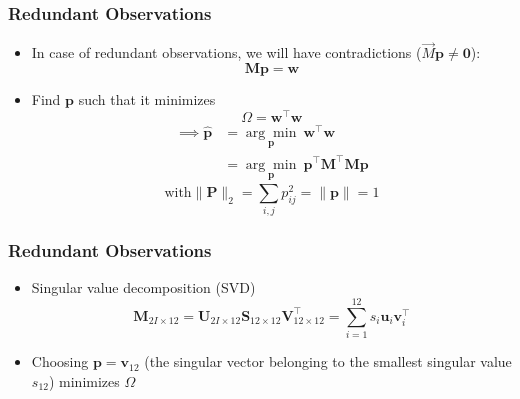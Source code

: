 \begin{frame}
    \frametitle{Redundant Observations}
    \begin{itemize}
        \item In case of redundant observations, we will have contradictions ($\vec{M}\mathbf{p} \neq \mathbf{0}$):
        \begin{equation*}
            \mathbf{M} \mathbf{p} = \mathbf{w}
        \end{equation*}
        \item Find $\mathbf{p}$ such that it minimizes
        \begin{equation*}
            \Omega = \mathbf{w}^{\top} \mathbf{w}
        \end{equation*}
        \begin{align*}
            \implies \mathbf{\hat{p}} &= \underset{\mathbf{p}}{\arg\min} \ \mathbf{w}^{\top} \mathbf{w}\\
            &= \underset{\mathbf{p}}{\arg\min} \ \mathbf{p}^{\top} \mathbf{M}^{\top} \mathbf{M} \mathbf{p}
        \end{align*}
        \begin{equation*}
          \text{with} \lVert\mathbf{P}\rVert_2 = \sum_{i,j} p_{ij}^2 = \lVert\mathbf{p}\rVert = 1
        \end{equation*}
    \end{itemize}
\end{frame}


\begin{frame}
    \frametitle{Redundant Observations}
    \begin{itemize}
        \item Singular value decomposition (SVD)
        \[
            \mathbf{M}_{2I \times 12} = \mathbf{U}_{2I \times 12} \mathbf{S}_{12 \times 12} \mathbf{V}_{12 \times 12}^{\top} = \sum_{i=1}^{12} s_i \mathbf{u}_i \mathbf{v}_i^{\top}
        \]
        \item Choosing $\mathbf{p} = \mathbf{v}_{12}$ (the singular vector belonging to the smallest singular value $s_{12}$) minimizes $\Omega$
    \end{itemize}
\end{frame}


